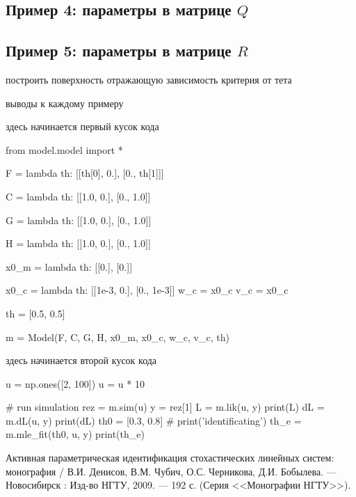 \documentclass[a4paper,14pt]{extarticle}
\renewcommand{\baselinestretch}{1.5}
\begin{document}
\subsection{Пример 4: параметры в матрице $Q$}

\subsection{Пример 5: параметры в матрице $R$}

построить поверхность отражающую зависимость критерия от тета

выводы к каждому примеру

здесь начинается первый кусок кода

\renewcommand{\baselinestretch}{1}
\begin{pyconsole}
from model.model import *

F = lambda th: [[th[0], 0.],
                [0., th[1]]]

C = lambda th: [[1.0, 0.],
                [0., 1.0]]

G = lambda th: [[1.0, 0.],
                [0., 1.0]]

H = lambda th: [[1.0, 0.],
                [0., 1.0]]

x0_m = lambda th: [[0.],
                   [0.]]

x0_c = lambda th: [[1e-3, 0.],
                   [0., 1e-3]]
w_c = x0_c
v_c = x0_c

th = [0.5, 0.5]

m = Model(F, C, G, H, x0_m, x0_c, w_c, v_c, th)
\end{pyconsole}
\renewcommand{\baselinestretch}{1.5}

\newpage

здесь начинается второй кусок кода
\begin{pyconsole}
u = np.ones([2, 100])
u = u * 10

# run simulation
rez = m.sim(u)
y = rez[1]
L = m.lik(u, y)
print(L)
dL = m.dL(u, y)
print(dL)
th0 = [0.3, 0.8]
# print('identificating')
th_e = m.mle_fit(th0, u, y) 
print(th_e)
\end{pyconsole}

\newpage

\begin{thebibliography}{9}

\begin{sloppypar}

 Активная параметрическая идентификация стохастических линейных
	систем: монография / В.И. Денисов, В.М. Чубич, О.С. Черникова, Д.И. Бобылева.
		--- Новосибирск : Изд-во НГТУ, 2009. --- 192 с.
		(Серия <<Монографии НГТУ>>).

\end{sloppypar}

\end{thebibliography}
\end{document}
